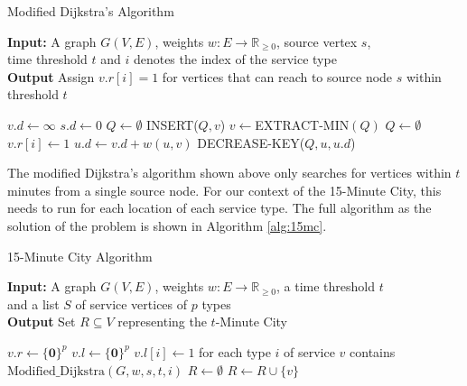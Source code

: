 \begin{algorithm}[H]
    \caption{Modified Dijkstra's Algorithm} \label{alg:modified_dijsktra}
    \textbf{Input:} A graph $G(V,E)$, weights $w:E\rightarrow\mathbb{R}_{\geq 0}$, source vertex $s$, \\  time threshold $t$ and $i$ denotes the index of the service type\\
    \textbf{Output} Assign $v.r[i]=1$ for vertices that can reach to source node $s$ within threshold $t$ %
    \begin{algorithmic}
            \State $v.d\gets\infty$
        \EndFor
        \State $s.d\gets 0$
        \State $Q\gets\emptyset$
            \State INSERT($Q,v$)
        \EndFor
            \State $v\gets$EXTRACT-MIN$(Q)$
                \State $Q\gets\emptyset$ 
            \Else
                \State $v.r[i] \gets 1 $
                        \State $u.d\gets v.d+w(u,v)$
                        \State DECREASE-KEY($Q,u,u.d$)
                    \EndIf
                \EndFor
            \EndIf
        \EndWhile
    \end{algorithmic}
\end{algorithm}

The modified Dijkstra's algorithm shown above only searches for vertices within $t$ minutes from a single source node. For our context of the 15-Minute City, this needs to run for each location of each service type. The full algorithm as the solution of the problem is shown in Algorithm \ref{alg:15mc}.

\begin{algorithm}[H]
    \caption{15-Minute City Algorithm}\label{alg:15mc}
    \textbf{Input:} A graph $G(V,E)$, weights $w:E\rightarrow\mathbb{R}_{\geq 0}$, a time threshold $t$ \\  and a list $S$ of service vertices of $p$ types\\
    \textbf{Output} Set $R\subseteq V$ representing the $t$-Minute City
    \begin{algorithmic}
            \State $v.r \gets \{\mathbf{0}\}^{p}$
            \State $v.l \gets \{\mathbf{0}\}^{p}$
        \EndFor
            \State $v.l[i] \gets 1$ for each type $i$ of service $v$ contains
        \EndFor
                \State $\text{Modified\_Dijkstra}(G,w,s,t,i)$
            \EndFor
        \EndFor
        \State $R\gets\emptyset$
                \State $R \gets R\cup \{v\}$
            \EndIf
        \EndFor
    \end{algorithmic}
\end{algorithm}

